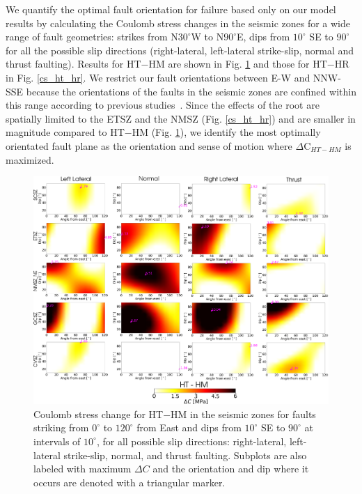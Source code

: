\documentclass[draft,linenumbers]{agujournal2018}
\begin{document}
     We quantify the optimal fault orientation for failure based only on our model results by calculating the Coulomb stress changes in the seismic zones for a wide range of fault geometries: strikes from N$30^\circ$W to N$90^\circ$E, dips from $10^\circ$ SE to $90^\circ$%
     for all the possible slip directions (right-lateral, left-lateral strike-slip, normal and thrust faulting). Results for HT$-$HM are shown in Fig. \ref{cs_ht_hm} and those for HT$-$HR in Fig. \ref{cs_ht_hr}. We restrict our fault orientations between E-W and NNW-SSE because the orientations of the faults in the seismic zones are confined within this range according to previous studies~\citep{shumway2008focal, hurd2012intraplate, johnson2014earthquake, cooley2015new}. Since the effects of the root are spatially limited to the ETSZ and the NMSZ (Fig. \ref{cs_ht_hr}) and are smaller in magnitude compared to HT$-$HM (Fig. \ref{cs_ht_hm}), we identify the most optimally orientated fault plane as the orientation and sense of motion where $\Delta$C$_{HT-HM}$ is maximized.
\begin{figure}[ht]
    \centering
    \includegraphics[width=\linewidth]{figures/ht_hm_summ.png}
    \caption{Coulomb stress change for HT$-$HM in the seismic zones for faults striking from $0^\circ$ to $120^\circ$ from East and dips from $10^\circ$ SE to $90^\circ$ at intervals of $10^\circ$, for all possible slip directions: right-lateral, left-lateral strike-slip, normal, and thrust faulting. Subplots are also labeled with maximum $\Delta C$ and the orientation and dip where it occurs are denoted with a triangular marker.}
    \label{cs_ht_hm}
\end{figure}
\end{document}
